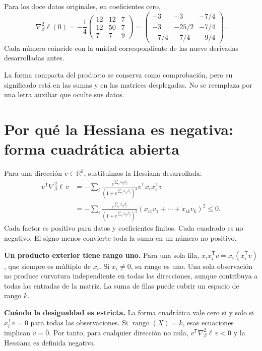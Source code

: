\documentclass[11pt,a4paper]{article}
\newcommand{\R}{\mathbb R}
\newcommand{\T}{^{\mathsf T}}
\DeclareMathOperator{\rank}{rango}
\begin{document}
\begin{ejemplo}
Para los doce datos originales, en coeficientes cero,
\[
\nabla_\beta^2\ell(0)
=-\frac14
\begin{pmatrix}12&12&7\\12&50&7\\7&7&9\end{pmatrix}
=\begin{pmatrix}-3&-3&-7/4\\-3&-25/2&-7/4\\-7/4&-7/4&-9/4\end{pmatrix}.
\]
Cada número coincide con la unidad correspondiente de las nueve
derivadas desarrolladas antes.
\end{ejemplo}
La forma compacta del producto se conserva como comprobación,
pero su significado está en las sumas y en las matrices desplegadas.
No se reemplaza por una letra auxiliar que oculte sus datos.

\clearpage
\section{Por qué la Hessiana es negativa: forma cuadrática abierta}\label{logit29}
Para una dirección $v\in\R^k$, sustituimos la Hessiana desarrollada:
\[
\begin{aligned}
v\T\nabla_\beta^2\ell\,v
&=-\sum_i
\frac{e^{\sum_jx_{ij}\beta_j}}{(1+e^{\sum_jx_{ij}\beta_j})^2}
v\T x_ix_i\T v\\
&=-\sum_i
\frac{e^{\sum_jx_{ij}\beta_j}}{(1+e^{\sum_jx_{ij}\beta_j})^2}
\left(x_{i1}v_1+\cdots+x_{ik}v_k\right)^2\le0.
\end{aligned}
\]
Cada factor es positivo para datos y coeficientes finitos.
Cada cuadrado es no negativo.
El signo menos convierte toda la suma en un número no positivo.

\textbf{Un producto exterior tiene rango uno.}
Para una sola fila, $x_ix_i\T v=x_i(x_i\T v)$,
que siempre es múltiplo de $x_i$.
Si $x_i\ne0$, su rango es uno.
Una sola observación no produce curvatura independiente en todas
las direcciones, aunque contribuya a todas las entradas de la matriz.
La suma de filas puede cubrir un espacio de rango $k$.

\textbf{Cuándo la desigualdad es estricta.}
La forma cuadrática vale cero si y solo si
$x_i\T v=0$ para todas las observaciones.
Si $\rank(X)=k$, esas ecuaciones implican $v=0$.
Por tanto, para cualquier dirección no nula,
$v\T\nabla_\beta^2\ell\,v<0$ y la Hessiana es definida negativa.
\end{document}
